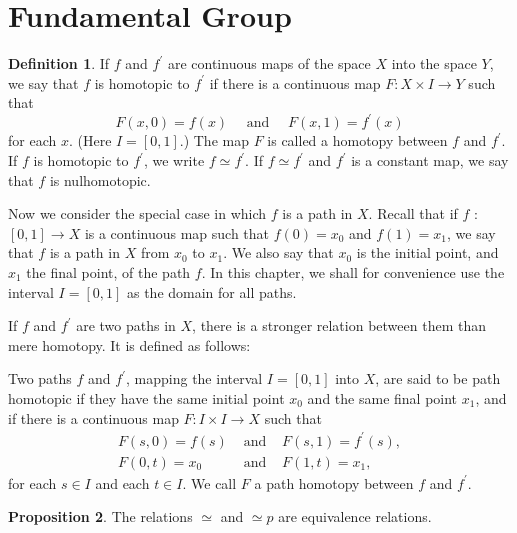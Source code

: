 \documentclass[12pt,a4paper]{book}
\theoremstyle{definition}
\newtheorem{defn}{Definition}[section]
\newtheorem{prop}[defn]{Proposition}
\begin{document}
\section{Fundamental Group}
\begin{defn}
    If $f$ and $f^{\prime}$ are continuous maps of the space $X$ into the space $Y$, we say that $f$ is homotopic to $f^{\prime}$ if there is a continuous map $F: X \times I \rightarrow Y$ such that
    $$
        F(x, 0)=f(x) \quad \text { and } \quad F(x, 1)=f^{\prime}(x)
    $$
    for each $x$. (Here $I=[0,1]$.) The map $F$ is called a homotopy between $f$ and $f^{\prime}$. If $f$ is homotopic to $f^{\prime}$, we write $f \simeq f^{\prime}$. If $f \simeq f^{\prime}$ and $f^{\prime}$ is a constant map, we say that $f$ is nulhomotopic.

    Now we consider the special case in which $f$ is a path in $X$. Recall that if $f$ : $[0,1] \rightarrow X$ is a continuous map such that $f(0)=x_0$ and $f(1)=x_1$, we say that $f$ is a path in $X$ from $x_0$ to $x_1$. We also say that $x_0$ is the initial point, and $x_1$ the final point, of the path $f$. In this chapter, we shall for convenience use the interval $I=[0,1]$ as the domain for all paths.

    If $f$ and $f^{\prime}$ are two paths in $X$, there is a stronger relation between them than mere homotopy. It is defined as follows:

    Two paths $f$ and $f^{\prime}$, mapping the interval $I=[0,1]$ into $X$, are said to be path homotopic if they have the same initial point $x_0$ and the same final point $x_1$, and if there is a continuous map $F: I \times I \rightarrow X$ such that
    $$
        \begin{array}{lll}
            F(s, 0)=f(s) & \text { and } & F(s, 1)=f^{\prime}(s), \\
            F(0, t)=x_0  & \text { and } & F(1, t)=x_1,
        \end{array}
    $$
    for each $s \in I$ and each $t \in I$. We call $F$ a path homotopy between $f$ and $f^{\prime}$.
\end{defn}
\begin{prop}
    The relations $\simeq$ and $\simeq p$ are equivalence relations.
\end{prop}
\end{document}

